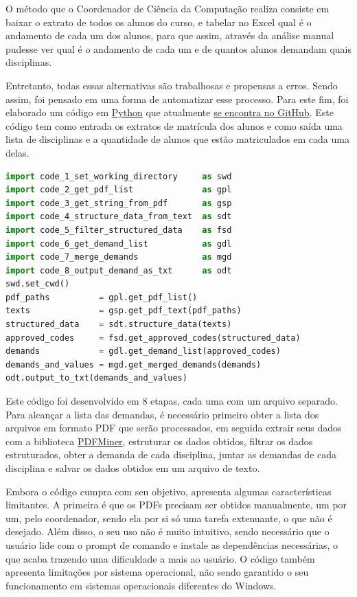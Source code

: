         O método que o Coordenador de Ciência da Computação realiza consiste em baixar o extrato de todos os alunos do curso, e tabelar no Excel qual é o andamento de cada um dos alunos, para que assim, através da análise manual pudesse ver qual é o andamento de cada um e de quantos alunos demandam quais disciplinas.

        Entretanto, todas essas alternativas são trabalhosas e propensas a erros. Sendo assim, foi pensado em uma forma de automatizar esse processo. Para este fim, foi elaborado um código em \href{https://www.python.org/}{Python} que atualmente \href{https://github.com/jvfd3/university_demand}{se encontra no GitHub}. Este código tem como entrada os extratos de matrícula dos alunos e como saída uma lista de disciplinas e a quantidade de alunos que estão matriculados em cada uma delas.

        \begin{lstlisting}[language=Python, caption={Obter demanda por extratos em PDF}]
import code_1_set_working_directory     as swd
import code_2_get_pdf_list              as gpl
import code_3_get_string_from_pdf       as gsp
import code_4_structure_data_from_text  as sdt
import code_5_filter_structured_data    as fsd
import code_6_get_demand_list           as gdl
import code_7_merge_demands             as mgd
import code_8_output_demand_as_txt      as odt
swd.set_cwd()
pdf_paths          = gpl.get_pdf_list()
texts              = gsp.get_pdf_text(pdf_paths)
structured_data    = sdt.structure_data(texts)
approved_codes     = fsd.get_approved_codes(structured_data)
demands            = gdl.get_demand_list(approved_codes)
demands_and_values = mgd.get_merged_demands(demands)
odt.output_to_txt(demands_and_values)
        \end{lstlisting}

        Este código foi desenvolvido em 8 etapas, cada uma com um arquivo separado. Para alcançar a lista das demandas, é necessário primeiro obter a lista dos arquivos em formato PDF que serão processados, em seguida extrair seus dados com a biblioteca \href{https://pypi.org/project/pdfminer/}{PDFMiner}, estruturar os dados obtidos, filtrar os dados estruturados, obter a demanda de cada disciplina, juntar as demandas de cada disciplina e salvar os dados obtidos em um arquivo de texto.

        Embora o código cumpra com seu objetivo, apresenta algumas características limitantes. A primeira é que os PDFs precisam ser obtidos manualmente, um por um, pelo coordenador, sendo ela por si só uma tarefa extenuante, o que não é desejado. Além disso, o seu uso não é muito intuitivo, sendo necessário que o usuário lide com o prompt de comando e instale as dependências necessárias, o que acaba trazendo uma dificuldade a mais ao usuário. O código também apresenta limitações por sistema operacional, não sendo garantido o seu funcionamento em sistemas operacionais diferentes do Windows.

